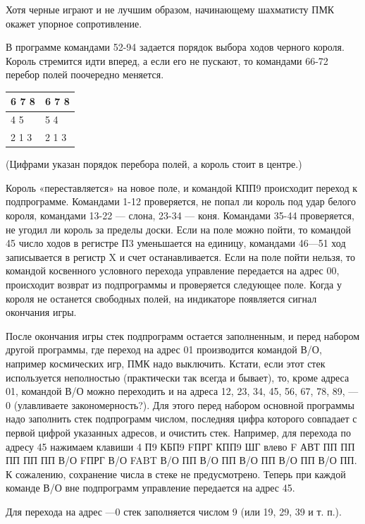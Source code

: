 \documentclass[11pt,a4paper,oneside]{article}
\begin{document}
Хотя черные играют и не лучшим образом, начинающему шахматисту ПМК окажет упорное сопротивление.

В программе командами 52-94 задается порядок выбора ходов черного короля. Король стремится идти вперед, а если его не пускают, то командами 66-72 перебор полей поочередно меняется.

\begin{table}[H]
\begin{tabular}{|l|l|}
\hline
6 7 8 & 6 7 8 \\ \hline
4 5   & 5 4   \\ \hline
2 1 3 & 2 1 3 \\ \hline
\end{tabular}
\end{table}

(Цифрами указан порядок перебора полей, а король стоит в центре.)

Король «переставляется» на новое поле, и командой КПП9 происходит переход к подпрограмме. Командами 1-12 
проверяется, не попал ли король под удар белого короля, командами 13-22 — слона, 23-34 — коня. Командами 35-44 проверяется, не угодил ли король за пределы доски. Если на поле можно пойти, то командой 45 число ходов в регистре П3 уменьшается на единицу, командами 46—51 ход записывается в регистр X и счет останавливается. Если на поле пойти нельзя, то командой косвенного условного перехода управление передается на адрес 00, происходит возврат из подпрограммы и проверяется следующее поле. Когда у короля не останется свободных полей, на индикаторе появляется сигнал окончания игры.

После окончания игры стек подпрограмм остается заполненным, и перед набором другой программы, где переход на адрес 01 производится командой В/О, например космических игр, ПМК надо выключить. Кстати, если этот стек используется неполностью (практически так всегда и бывает), то, кроме адреса 01, командой В/О можно переходить и на адреса 12, 23, 34, 45, 56, 67, 78, 89, —0 (улавливаете закономерность?). Для этого перед набором основной программы надо заполнить стек подпрограмм числом, последняя цифра которого совпадает с первой цифрой указанных адресов, и очистить стек. Например, для перехода по адресу 45 нажимаем клавиши 4 П9 КБП9 FПРГ КПП9 ШГ влево F АВТ ПП ПП ПП ПП ПП В/О FПРГ В/О FABT В/О ПП В/О ПП В/О ПП В/О ПП В/О ПП. К сожалению, сохранение числа в стеке не предусмотрено. Теперь при каждой команде В/О вне подпрограмм управление передается на адрес 45.

Для перехода на адрес —0 стек заполняется числом 9 (или 19, 29, 39 и т. п.).
\end{document}
